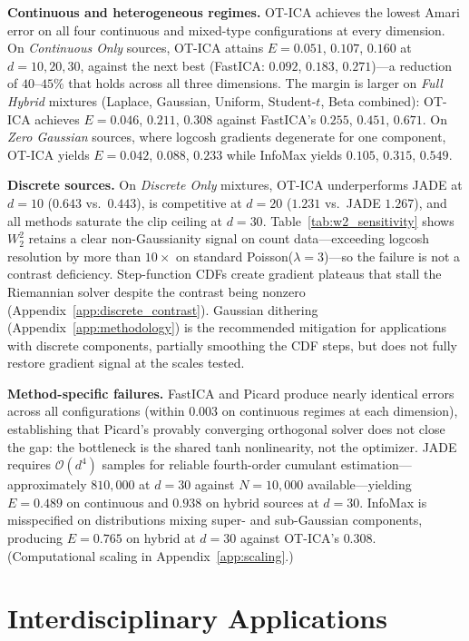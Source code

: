 \documentclass{tpm2026} %
\begin{document}
\textbf{Continuous and heterogeneous regimes.} OT-ICA achieves the lowest Amari error on all four continuous and mixed-type configurations at every dimension. On \textit{Continuous Only} sources, OT-ICA attains $E = 0.051$, $0.107$, $0.160$ at $d = 10, 20, 30$, against the next best (FastICA: $0.092$, $0.183$, $0.271$)---a reduction of $40$--$45\%$ that holds across all three dimensions. The margin is larger on \textit{Full Hybrid} mixtures (Laplace, Gaussian, Uniform, Student-$t$, Beta combined): OT-ICA achieves $E = 0.046$, $0.211$, $0.308$ against FastICA's $0.255$, $0.451$, $0.671$. On \textit{Zero Gaussian} sources, where logcosh gradients degenerate for one component, OT-ICA yields $E = 0.042$, $0.088$, $0.233$ while InfoMax yields $0.105$, $0.315$, $0.549$.

\textbf{Discrete sources.} On \textit{Discrete Only} mixtures, OT-ICA underperforms JADE at $d = 10$ ($0.643$ vs.\ $0.443$), is competitive at $d = 20$ ($1.231$ vs.\ JADE $1.267$), and all methods saturate the clip ceiling at $d = 30$. Table~\ref{tab:w2_sensitivity} shows $W_2^2$ retains a clear non-Gaussianity signal on count data---exceeding logcosh resolution by more than $10{\times}$ on standard Poisson($\lambda=3$)---so the failure is not a contrast deficiency. Step-function CDFs create gradient plateaus that stall the Riemannian solver despite the contrast being nonzero (Appendix~\ref{app:discrete_contrast}). Gaussian dithering (Appendix~\ref{app:methodology}) is the recommended mitigation for applications with discrete components, partially smoothing the CDF steps, but does not fully restore gradient signal at the scales tested.

\textbf{Method-specific failures.} FastICA and Picard \citep{ablin2018faster} produce nearly identical errors across all configurations (within $0.003$ on continuous regimes at each dimension), establishing that Picard's provably converging orthogonal solver does not close the gap: the bottleneck is the shared tanh nonlinearity, not the optimizer. JADE requires $\mathcal{O}(d^4)$ samples for reliable fourth-order cumulant estimation---approximately $810{,}000$ at $d = 30$ against $N = 10{,}000$ available---yielding $E = 0.489$ on continuous and $0.938$ on hybrid sources at $d = 30$. InfoMax \citep{bell1995information} is misspecified on distributions mixing super- and sub-Gaussian components, producing $E = 0.765$ on hybrid at $d = 30$ against OT-ICA's $0.308$. (Computational scaling in Appendix~\ref{app:scaling}.)

\section{Interdisciplinary Applications}
\end{document}
